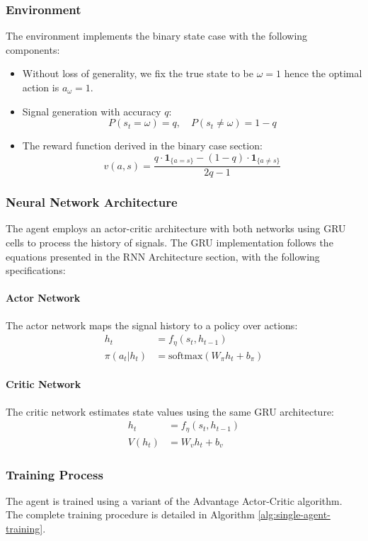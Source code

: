 \subsubsection*{Environment}
The environment implements the binary state case with the following components:

\begin{itemize}
    \item Without loss of generality, we fix the true state to be $\omega = 1$ hence the optimal action is $a_\omega = 1$.
    \item Signal generation with accuracy $q$:
    \[
        P(s_t = \omega) = q, \quad P(s_t \neq \omega) = 1-q
    \]
    \item The reward function derived in the binary case section:
    \[
        v(a,s) = \frac{q \cdot \mathbf{1}_{\{a = s\}} - (1-q) \cdot \mathbf{1}_{\{a \neq s\}}}{2q-1}
    \]
\end{itemize}

\subsubsection*{Neural Network Architecture}
The agent employs an actor-critic architecture with both networks using GRU cells to process the history of signals. The GRU implementation follows the equations presented in the RNN Architecture section, with the following specifications:

\paragraph{Actor Network}
The actor network maps the signal history to a policy over actions:
\begin{align*}
    h_t &= f_{\eta}(s_t, h_{t-1}) \\
    \pi(a_t|h_t) &= \text{softmax}(W_\pi h_t + b_\pi)
\end{align*}

\paragraph{Critic Network}
The critic network estimates state values using the same GRU architecture:
\begin{align*}
    h_t &= f_{\eta}(s_t, h_{t-1}) \\
    V(h_t) &= W_v h_t + b_v
\end{align*}

\subsubsection*{Training Process}
The agent is trained using a variant of the Advantage Actor-Critic algorithm. The complete training procedure is detailed in Algorithm \ref{alg:single-agent-training}.

